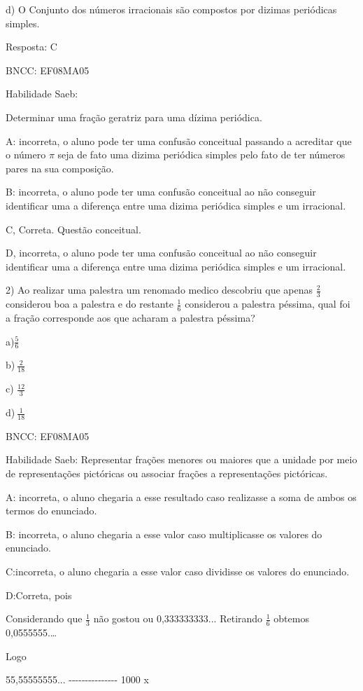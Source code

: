 d) O Conjunto dos números irracionais são compostos por dizimas
periódicas simples.

Resposta: C

BNCC: EF08MA05

Habilidade Saeb:

Determinar uma fração geratriz para uma dízima periódica.

A: incorreta, o aluno pode ter uma confusão conceitual passando a
acreditar que o número \(\pi\) seja de fato uma dizima periódica simples
pelo fato de ter números pares na sua composição.

B: incorreta, o aluno pode ter uma confusão conceitual ao não conseguir
identificar uma a diferença entre uma dizima periódica simples e um
irracional.

C, Correta. Questão conceitual.

D, incorreta, o aluno pode ter uma confusão conceitual ao não conseguir
identificar uma a diferença entre uma dizima periódica simples e um
irracional.

2) Ao realizar uma palestra um renomado medico descobriu que apenas
\(\frac{2}{3}\) considerou boa a palestra e do restante \(\frac{1}{6}\)
considerou a palestra péssima, qual foi a fração corresponde aos que
acharam a palestra péssima?

a)\(\frac{5}{6}\)

b)\(\ \frac{2}{18}\)

c) \(\frac{12}{3}\)

d)\(\ \frac{1}{18}\)

BNCC: EF08MA05

Habilidade Saeb: Representar frações menores ou maiores que a unidade
por meio de representações pictóricas ou associar frações a
representações pictóricas.

A: incorreta, o aluno chegaria a esse resultado caso realizasse a soma
de ambos os termos do enunciado.

B: incorreta, o aluno chegaria a esse valor caso multiplicasse os
valores do enunciado.

C:incorreta, o aluno chegaria a esse valor caso dividisse os valores do
enunciado.

D:Correta, pois

Considerando que \(\frac{1}{3}\) não gostou ou 0,333333333... Retirando
\(\frac{1}{6}\) obtemos 0,0555555.\ldots{}

Logo

55,55555555... -\/-\/-\/-\/-\/-\/-\/-\/-\/-\/-\/-\/-\/-\/- 1000 x

